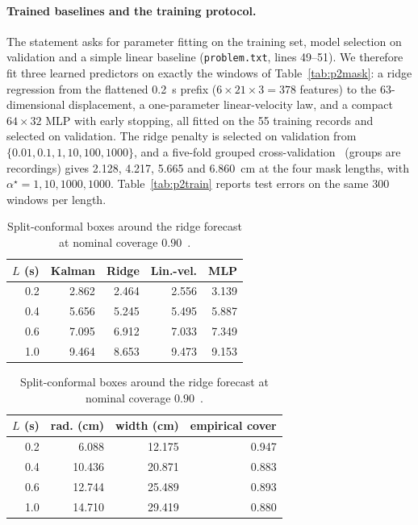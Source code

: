 \documentclass{swmcmthesis}
\begin{document}
\paragraph{Trained baselines and the training protocol.} The statement asks for parameter fitting on the training set, model selection on validation and a simple linear baseline (\texttt{problem.txt}, lines 49--51). We therefore fit three learned predictors on exactly the windows of Table~\ref{tab:p2mask}: a ridge regression from the flattened 0.2~s prefix ($6\times21\times3=378$ features) to the 63-dimensional displacement, a one-parameter linear-velocity law, and a compact $64\times32$ MLP with early stopping, all fitted on the 55 training records and selected on validation. The ridge penalty is selected on validation from $\{0.01,0.1,1,10,100,1000\}$, and a five-fold grouped cross-validation~\cite{ref9} (groups are recordings) gives 2.128, 4.217, 5.665 and 6.860~cm at the four mask lengths, with $\alpha^\star=1,10,1000,1000$. Table~\ref{tab:p2train} reports test errors on the same 300 windows per length.

\begin{table}[tbp]\centering\footnotesize
\caption{Trained predictors on the official masking windows (mean 3D error, cm); all are fitted on training records and share the test windows.}\label{tab:p2train}
\begin{tabular}{@{}rrrrr@{}}
\toprule
$L$ (s) & Kalman & Ridge & Lin.-vel. & MLP \\
\midrule
  0.2 & 2.862 & 2.464 & 2.556 & 3.139 \\
  0.4 & 5.656 & 5.245 & 5.495 & 5.887 \\
  0.6 & 7.095 & 6.912 & 7.033 & 7.349 \\
  1.0 & 9.464 & 8.653 & 9.473 & 9.153 \\
\bottomrule
\end{tabular}

\vspace{7pt}
\caption{Split-conformal boxes around the ridge forecast at nominal coverage $0.90$~\cite{ref11,ref12}.}\label{tab:p2conf}
\begin{tabular}{@{}rrrr@{}}
\toprule
$L$ (s) & rad. (cm) & width (cm) & empirical cover \\
\midrule
  0.2 & 6.088 & 12.175 & 0.947 \\
  0.4 & 10.436 & 20.871 & 0.883 \\
  0.6 & 12.744 & 25.489 & 0.893 \\
  1.0 & 14.710 & 29.419 & 0.880 \\
\bottomrule
\end{tabular}
\end{table}
\end{document}
